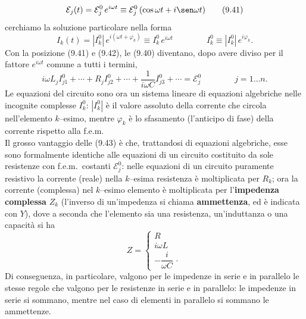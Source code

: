 \begin{equation}
  \mathcal E_j(t)=\mathcal E_j^0\,e^{i\omega t}
  \equiv\mathcal E_j^0\,(\cos\omega t+i\sen\omega t)
  \tag{9.41}
\end{equation}
cerchiamo la soluzione particolare nella forma
\begin{equation}
  I_k(t)=|I_k^0|\,e^{i(\omega t+\varphi_k)}\equiv I_k^0\,e^{i\omega t}
  \qquad\qquad I_k^0\equiv|I_k^0|\,e^{i\varphi_k}.
  \tag{9.42}
\end{equation}
Con la posizione (9.41) e (9.42), le (9.40) diventano, dopo avere diviso per il
fattore $e^{i\omega t}$ comune a tutti i termini,
\begin{equation}
  i\omega L_jI_{j1}^0+\cdots+R_jI_{j2}^0+\cdots
  +\frac{1}{i\omega C}I_{j3}^0+\cdots=\mathcal E_j^0\qquad\qquad j=1\dots n.
  \tag{9.43}
\end{equation}
Le equazioni del circuito sono ora un sistema lineare di equazioni algebriche
nelle incognite complesse $I_k^0$: $|I_k^0|$ \`e il valore assoluto della
corrente che circola nell'elemento $k$--esimo, mentre $\varphi_k$ \`e lo
sfasamento (l'anticipo di fase) della corrente rispetto alla f.e.m.\\
Il grosso vantaggio delle (9.43) \`e che, trattandosi di equazioni algebriche,
esse sono formalmente identiche alle equazioni di un circuito costituito da sole
resistenze con f.e.m.\ costanti $\mathcal E_j^0$: nelle equazioni di un circuito
puramente resistivo la corrente (reale) nella $k$--esima resistenza \`e
moltiplicata per $R_k$; ora la corrente (complessa) nel $k$--esimo elemento \`e
moltiplicata per l'\textbf{impedenza complessa} $Z_k$ (l'inverso di un'impedenza
si chiama \textbf{ammettenza}, ed \`e indicata con $Y$), dove a seconda che
l'elemento sia una resistenza, un'induttanza o una capacit\`a si ha
\begin{equation}
  Z=\left\{\begin{array}{l}
    R\\[2pt]
    i\omega L\\[2pt]
    -\dfrac{i}{\omega C}\,\cdot
  \end{array}\right.
  \tag{9.44}
\end{equation}
Di conseguenza, in particolare, valgono per le impedenze in serie e in parallelo
le stesse regole che valgono per le resistenze in serie e in parallelo: le
impedenze in serie si sommano, mentre nel caso di elementi in parallelo si
sommano le ammettenze.

